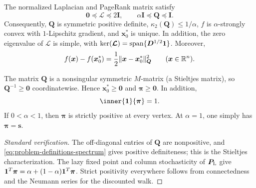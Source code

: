\documentclass[11pt]{article}
\begin{document}
\begin{proposition}
\label{prop:problem-definitions-spectrum}
The normalized Laplacian and PageRank matrix satisfy
\begin{equation}
    \bm{0}\preceq\bm{\mathcal L}\preceq2\bm{I},
    \qquad
    \alpha \bm{I}\preceq \bm{Q}\preceq \bm{I}.
    \label{eq:problem-definitions-spectrum}
\end{equation}
Consequently, $\bm{Q}$ is symmetric positive definite,
$\kappa_2(\bm{Q})\leq1/\alpha$, $f$ is $\alpha$-strongly convex with
$1$-Lipschitz gradient, and $\bm{x}_0^*$ is unique. In addition,
the zero eigenvalue of $\bm{\mathcal L}$ is simple, with
$\ker(\bm{\mathcal L})=\operatorname{span}\{\bm{D}^{1/2}\mathbf{1}\}$. Moreover,
\begin{equation}
    f(\bm{x})-f(\bm{x}_0^*)
    =\frac12\lVert\bm{x}-\bm{x}_0^*\rVert_{\bm{Q}}^2
    \qquad(\bm{x}\in\mathbb{R}^n).
    \label{eq:problem-definitions-quadratic-gap}
\end{equation}
\end{proposition}

\begin{proposition}
\label{prop:problem-definitions-positivity}
The matrix $\bm{Q}$ is a nonsingular symmetric $M$-matrix (a Stieltjes
matrix), so $\bm{Q}^{-1}\geq\bm{0}$ coordinatewise. Hence
$\bm{x}_0^*\geq\bm{0}$ and $\bm{\pi}\geq\bm{0}$. In addition,
\begin{equation}
    \inner{\one}{\bm{\pi}}=1.
    \label{eq:problem-definitions-unit-mass}
\end{equation}
If $0<\alpha<1$, then $\bm{\pi}$ is strictly positive at every vertex. At
$\alpha=1$, one simply has $\bm{\pi}=\bm{s}$.
\end{proposition}

\begin{proof}[Standard verification]
The off-diagonal entries of $\bm{Q}$ are nonpositive, and
\cref{eq:problem-definitions-spectrum} gives positive definiteness; this is
the Stieltjes characterization.  The lazy fixed point and column
stochasticity of $\bm{P}_{\rm L}$ give
$\mathbf{1}^T\bm{\pi}=\alpha+(1-\alpha)\mathbf{1}^T\bm{\pi}$. Strict positivity everywhere follows
from connectedness and the Neumann series for the discounted walk.
\end{proof}
\end{document}
